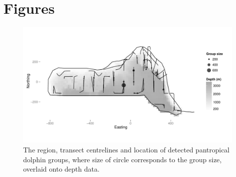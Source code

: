 \documentclass[a4paper,12pt]{article}
\begin{document}
\newpage




\newpage


\newpage


\section*{Figures}

\begin{figure}[h!]
  \caption{The region, transect centrelines and location of detected pantropical dolphin groups, where size of circle corresponds to the group size, overlaid onto depth data.}
  \label{dolphin-eda}
  \begin{center}
    \includegraphics[width=\textwidth]{depth-transects}
  \end{center}
\end{figure}

\newpage
\end{document}
